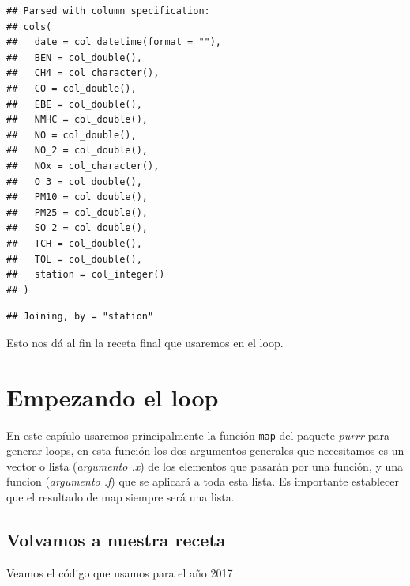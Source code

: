 \documentclass[]{book}
\begin{document}
\begin{verbatim}
## Parsed with column specification:
## cols(
##   date = col_datetime(format = ""),
##   BEN = col_double(),
##   CH4 = col_character(),
##   CO = col_double(),
##   EBE = col_double(),
##   NMHC = col_double(),
##   NO = col_double(),
##   NO_2 = col_double(),
##   NOx = col_character(),
##   O_3 = col_double(),
##   PM10 = col_double(),
##   PM25 = col_double(),
##   SO_2 = col_double(),
##   TCH = col_double(),
##   TOL = col_double(),
##   station = col_integer()
## )
\end{verbatim}

\begin{verbatim}
## Joining, by = "station"
\end{verbatim}

Esto nos dá al fin la receta final que usaremos en el loop.

\hypertarget{empezando-el-loop}{%
\section{Empezando el loop}\label{empezando-el-loop}}

En este capíulo usaremos principalmente la función \texttt{map} del
paquete \emph{purrr} para generar loops, en esta función los dos
argumentos generales que necesitamos es un vector o lista
(\emph{argumento .x}) de los elementos que pasarán por una función, y
una funcion (\emph{argumento .f}) que se aplicará a toda esta lista. Es
importante establecer que el resultado de map siempre será una lista.

\hypertarget{volvamos-a-nuestra-receta}{%
\subsection{Volvamos a nuestra receta}\label{volvamos-a-nuestra-receta}}

Veamos el código que usamos para el año 2017
\end{document}
